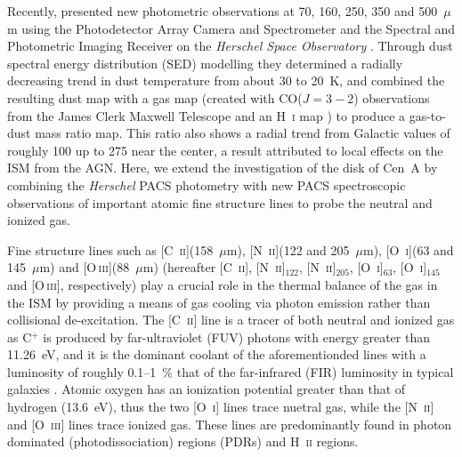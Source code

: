 \documentclass[preprint2]{aastex}
\begin{document}
Recently, \citet{2012MNRAS.422.2291P} presented new photometric observations at 70, 160, 250, 350 and 500~$\mu$m using the Photodetector Array Camera and Spectrometer \citep[PACS;][]{2010A&A...518L...2P} and the Spectral and Photometric Imaging Receiver \citep[SPIRE;][]{2010A&A...518L...3G} on the \emph{Herschel Space Observatory} \citep{2010A&A...518L...1P}.  Through dust spectral energy distribution (SED) modelling they determined a radially decreasing trend in dust temperature from about 30 to 20~K, and combined the resulting dust map with a gas map (created with CO($J=3-2$) observations from the James Clerk Maxwell Telescope and an H~\textsc{i} map \citep{2010A&A...515A..67S}) to produce a gas-to-dust mass ratio map.  This ratio also shows a radial trend from Galactic values of roughly 100 up to 275 near the center, a result attributed to local effects on the ISM from the AGN.  Here, we extend the investigation of the disk of Cen~A by combining the \emph{Herschel} PACS photometry with new PACS spectroscopic observations of important atomic fine structure lines to probe the neutral and ionized gas.

Fine structure lines such as [C~\textsc{ii}](158~$\mu$m), [N~\textsc{ii}](122 and 205~$\mu$m), [O~\textsc{i}](63 and 145~$\mu$m) and [O\,\textsc{iii}](88~$\mu$m) (hereafter [C~\textsc{ii}], [N~\textsc{ii}]$_{122}$, [N~\textsc{ii}]$_{205}$, [O~\textsc{i}]$_{63}$, [O~\textsc{i}]$_{145}$ and [O\,\textsc{iii}], respectively) play a crucial role in the thermal balance of the gas in the ISM by providing a means of gas cooling via photon emission rather than collisional de-excitation.  The [C~\textsc{ii}] line is a tracer of both neutral and ionized gas as C$^{+}$ is produced by far-ultraviolet (FUV) photons with energy greater than 11.26~eV, and it is the dominant coolant of the aforementionded lines with a luminosity of roughly 0.1--1~\% that of the far-infrared (FIR) luminosity in typical galaxies \citep[e.g.][]{1985ApJ...289..803S, 1993ApJ...404..219S, 2001ApJ...561..766M, 2011ApJ...728L...7G, parkin_2013}.  Atomic oxygen has an ionization potential greater than that of hydrogen (13.6~eV), thus the two [O~\textsc{i}] lines trace nuetral gas, while the [N~\textsc{ii}] and [O~\textsc{iii}] lines trace ionized gas.  These lines are predominantly found in photon dominated (photodissociation) regions (PDRs) and H~\textsc{ii} regions.
\end{document}
